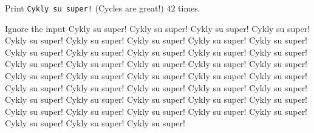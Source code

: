 




Print \texttt{Cykly su super!} (Cycles are great!) $42$ times.

\vstup
Ignore the input
\vystup
Cykly su super!
Cykly su super!
Cykly su super!
Cykly su super!
Cykly su super!
Cykly su super!
Cykly su super!
Cykly su super!
Cykly su super!
Cykly su super!
Cykly su super!
Cykly su super!
Cykly su super!
Cykly su super!
Cykly su super!
Cykly su super!
Cykly su super!
Cykly su super!
Cykly su super!
Cykly su super!
Cykly su super!
Cykly su super!
Cykly su super!
Cykly su super!
Cykly su super!
Cykly su super!
Cykly su super!
Cykly su super!
Cykly su super!
Cykly su super!
Cykly su super!
Cykly su super!
Cykly su super!
Cykly su super!
Cykly su super!
Cykly su super!
Cykly su super!
Cykly su super!
Cykly su super!
Cykly su super!
Cykly su super!
Cykly su super!
\koniec

